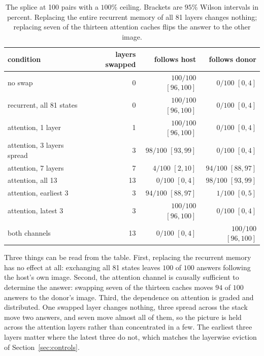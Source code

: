 \documentclass{article}
\begin{document}
\begin{table}[t]
\centering\small
\begin{tabular}{lrrr}
\toprule
condition & layers swapped & follows host & follows donor \\
\midrule
no swap                       & 0  & $100/100$ $[96,100]$ & $0/100$ $[0,4]$ \\
recurrent, all 81 states      & 0  & $100/100$ $[96,100]$ & $0/100$ $[0,4]$ \\
\addlinespace
attention, 1 layer            & 1  & $100/100$ $[96,100]$ & $0/100$ $[0,4]$ \\
attention, 3 layers spread    & 3  & $98/100$ $[93,99]$   & $0/100$ $[0,4]$ \\
attention, 7 layers           & 7  & $4/100$ $[2,10]$     & $94/100$ $[88,97]$ \\
attention, all 13             & 13 & $0/100$ $[0,4]$      & $98/100$ $[93,99]$ \\
\addlinespace
attention, earliest 3         & 3  & $94/100$ $[88,97]$   & $1/100$ $[0,5]$ \\
attention, latest 3           & 3  & $100/100$ $[96,100]$ & $0/100$ $[0,4]$ \\
both channels                 & 13 & $0/100$ $[0,4]$      & $100/100$ $[96,100]$ \\
\bottomrule
\end{tabular}
\caption{The splice at 100 pairs with a $100\%$ ceiling. Brackets are $95\%$
Wilson intervals in percent. Replacing the entire recurrent memory of all 81
layers changes nothing; replacing seven of the thirteen attention caches flips
the answer to the other image.}
\label{tab:splice}
\end{table}

Three things can be read from the table. First, replacing the recurrent memory
has no effect at all: exchanging all 81 states leaves $100$ of $100$ answers
following the host's own image. Second, the attention channel is causally
sufficient to determine the
answer: swapping seven of the thirteen caches moves $94$ of $100$ answers to
the donor's image. Third, the dependence on attention is graded and
distributed. One swapped layer changes nothing, three spread across the stack
move two answers, and seven move almost all of them, so the picture is held
across the attention layers rather than concentrated in a few. The earliest
three layers matter where the latest three do not, which matches the layerwise
eviction of Section~\ref{sec:controls}.
\end{document}
